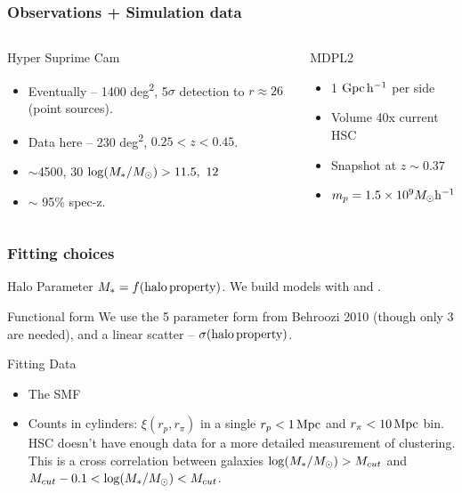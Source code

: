 \documentclass[t]{beamer}
\begin{document}
\begin{frame}
    \frametitle{Observations + Simulation data}

    \begin{columns}

    \begin{block}{Hyper Suprime Cam}
        \begin{itemize}
            \item Eventually -- 1400 deg\textsuperscript{2}, 5$\sigma$ detection to $r \approx 26$ (point sources).
            \item Data here -- 230 deg\textsuperscript{2}, $0.25 < z < 0.45$.
            \item $\sim{}$4500, 30 ${\rm log}{}(M_{\ast}{} / \mbox{$M_{\odot}$}{}) > 11.5,\ 12$
            \item $\sim$ 95\% spec-z.
        \end{itemize}
    \end{block}

    \begin{block}{MDPL2}
        \begin{itemize}
            \item 1 ${\rm Gpc}{}\, {\rm h^{-1}}{}$ per side
            \item Volume 40x current HSC
            \item Snapshot at $z \sim{} 0.37$
            \item $m_p = 1.5 \times 10^{9} \mbox{$M_{\odot}$} {\rm h^{-1}}$
        \end{itemize}
    \end{block}

    \end{columns}

\end{frame}

\begin{frame}
    \frametitle{Fitting choices}

    \begin{block}{Halo Parameter}
        $M_{\ast}{} = f({\rm halo\, property})$. We build models with \vmp{} and \MhaloPeak{}.
    \end{block}

    \begin{block}{Functional form}
        We use the 5 parameter form from Behroozi 2010 (though only 3 are needed), and a linear scatter -- $\sigma({\rm halo\, property})$.
    \end{block}

    \begin{block}{Fitting Data}
        \begin{itemize}
            \item The SMF
            \item Counts in cylinders: $\xi(r_p, r_{\pi})$ in a single $r_p < 1\,{\rm Mpc}$ and $r_{\pi} < 10\,{\rm Mpc}$ bin. HSC doesn't have enough data for a more detailed measurement of clustering. This is a cross correlation between galaxies ${\rm log}{}(M_{\ast}{} / \mbox{$M_{\odot}$}{}) > M_{cut}$ and $M_{cut} - 0.1 < {\rm log}{}(M_{\ast}{} / \mbox{$M_{\odot}$}{}) < M_{cut}$.
        \end{itemize}
    \end{block}

\end{frame}
\end{document}
